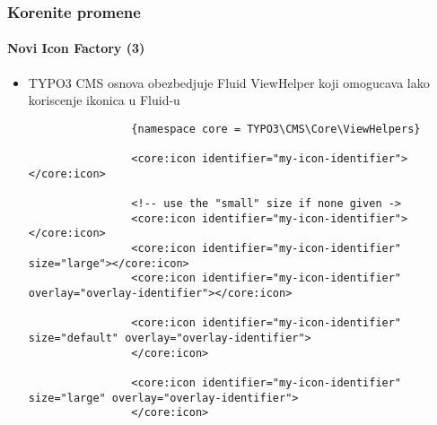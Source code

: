 \begin{frame}[fragile]
	\frametitle{Korenite promene}
	\framesubtitle{Novi Icon Factory (3)}

	\lstset{basicstyle=\tiny\ttfamily}

	\begin{itemize}

		\item TYPO3 CMS osnova obezbedjuje Fluid ViewHelper koji omogucava lako koriscenje ikonica u Fluid-u

			\begin{lstlisting}
				{namespace core = TYPO3\CMS\Core\ViewHelpers}

				<core:icon identifier="my-icon-identifier"></core:icon>

				<!-- use the "small" size if none given ->
				<core:icon identifier="my-icon-identifier"></core:icon>
				<core:icon identifier="my-icon-identifier" size="large"></core:icon>
				<core:icon identifier="my-icon-identifier" overlay="overlay-identifier"></core:icon>

				<core:icon identifier="my-icon-identifier" size="default" overlay="overlay-identifier">
				</core:icon>

				<core:icon identifier="my-icon-identifier" size="large" overlay="overlay-identifier">
				</core:icon>
			\end{lstlisting}

	\end{itemize}

\end{frame}


